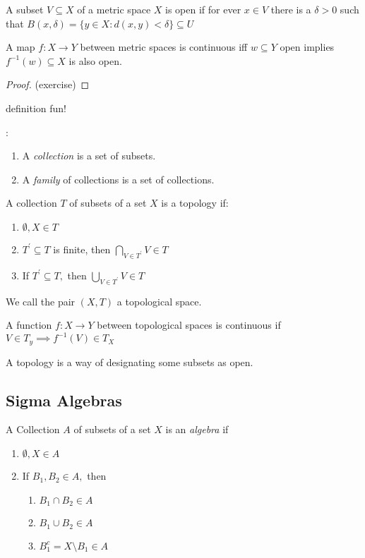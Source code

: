 A subset $V \subseteq X$ of a metric space $X$ is open if for ever $x \in V$ there is a $\delta >0 $ such that $B(x,\delta) = \{y \in X: d(x,y) < \delta\} \subseteq U$ 

\begin{theorem}
	A map $f:X \to Y$ between metric spaces is continuous iff  $w \subseteq Y$ open implies $f^{-1}(w) \subseteq X$ is also open.
\end{theorem}

\begin{proof}
	(exercise)
\end{proof}

definition fun! \\
\begin{definition}:
\begin{enumerate}
	\item A \emph{collection} is a set of subsets. 
	\item A \emph{family} of collections is a set of collections.
\end{enumerate}
\end{definition}

\begin{definition}
	A collection $T$ of subsets of a set $X$ is a topology if:
	\begin{enumerate}
		\item $\emptyset, X \in T$ 
		\item $T^{'} \subseteq T$ is finite, then $\bigcap\limits_{V \in T^{'}} V \in T$ 
		\item If $T^{'} \subseteq T,$ then $\bigcup\limits_{V \in T^{'}} V \in T$
	\end{enumerate}

	We call the pair $(X, T)$ a topological space.
\end{definition}


A function $f:X \to Y$ between topological spaces is continuous if $V \in T_y \implies f^{-1}(V) \in T_X$

\begin{claim*}
	A topology is a way of designating some subsets as open.	
\end{claim*}

\subsection{Sigma Algebras}

\begin{definition}[Algebra]
	A Collection $A$ of subsets of a set $X$ is an \emph{algebra} if 
	\begin{enumerate}
		\item $\emptyset, X \in A$
		\item If $B_1, B_2 \in A,$ then
			\begin{enumerate}
				\item $B_1 \cap B_2 \in A$
				\item  $B_1 \cup B_2 \in A$
				\item  $B_1^{c} = X \setminus B_1 \in A$
			\end{enumerate}
	\end{enumerate}
\end{definition}

